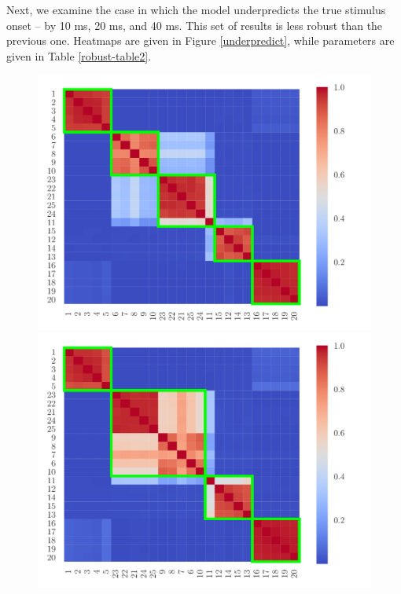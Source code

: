 \documentclass[twoside]{article}
\begin{document}
Next, we examine the case in which the model underpredicts the true stimulus onset -- by 10 ms, 20 ms, and 40 ms.  This set of results is less robust than the previous one.  Heatmaps are given in Figure \ref{underpredict}, while parameters are given in Table \ref{robust-table2}.  
\begin{figure}[h]
\begin{center}
\includegraphics[scale=0.26]{../img/sim_shift-2.pdf}
\includegraphics[scale=0.26]{../img/sim_shift-4.pdf}

\end{center}
\end{figure}
\end{document}
